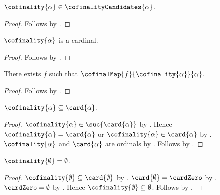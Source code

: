 \begin{proposition}\label{cofinality_belongs_to_candidates}
    $\cofinality{\alpha}\in\cofinalityCandidates{\alpha}$.
\end{proposition}
\begin{proof}
    Follows by
        .
\end{proof}

\begin{theorem}\label{cofinality_is_cardinal}
    $\cofinality{\alpha}$ is a cardinal.
\end{theorem}
\begin{proof}
    Follows by
        .
\end{proof}

\begin{theorem}\label{cofinality_map_exists}
    There exists $f$ such that
        $\cofinalMap{f}{\cofinality{\alpha}}{\alpha}$.
\end{theorem}
\begin{proof}
    Follows by
        .
\end{proof}

\begin{proposition}\label{cofinality_subseteq_card}
    $\cofinality{\alpha}\subseteq\card{\alpha}$.
\end{proposition}
\begin{proof}
    $\cofinality{\alpha}\in\suc{\card{\alpha}}$
        by .
    Hence $\cofinality{\alpha}=\card{\alpha}$ or
        $\cofinality{\alpha}\in\card{\alpha}$ by .
    $\cofinality{\alpha}$ and $\card{\alpha}$ are ordinals
        by .
    Follows by .
\end{proof}

\begin{proposition}\label{cofinality_emptyset}
    $\cofinality{\emptyset}=\emptyset$.
\end{proposition}
\begin{proof}
    $\cofinality{\emptyset}\subseteq\card{\emptyset}$
        by .
    $\card{\emptyset}=\cardZero$ by .
    $\cardZero=\emptyset$ by .
    Hence $\cofinality{\emptyset}\subseteq\emptyset$.
    Follows by .
\end{proof}

